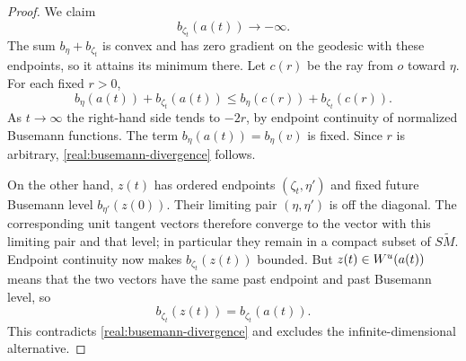 \begin{proof}
We claim
\begin{equation}\label{real:busemann-divergence}
 b_{\zeta_t}(a(t))\longrightarrow-\infty.
\end{equation}
The sum $b_\eta+b_{\zeta_t}$ is convex and has zero gradient on
the geodesic with these endpoints, so it attains its minimum
there. Let $c(r)$ be the ray from $o$ toward $\eta$. For each
fixed $r>0$,
\[
 b_\eta(a(t))+b_{\zeta_t}(a(t))
      \le b_\eta(c(r))+b_{\zeta_t}(c(r)).
\]
As $t\to\infty$ the right-hand side tends to $-2r$, by endpoint
continuity of normalized Busemann functions. The term
$b_\eta(a(t))=b_\eta(v)$ is fixed. Since $r$ is arbitrary,
\eqref{real:busemann-divergence} follows.

On the other hand, $z(t)$ has ordered endpoints
$(\zeta_t,\eta')$ and fixed future Busemann level
$b_{\eta'}(z(0))$. Their limiting pair $(\eta,\eta')$ is off the
diagonal. The corresponding unit tangent vectors therefore
converge to the vector with this limiting pair and that level;
in particular they remain in a compact subset of
$S\widetilde M$. Endpoint continuity now makes
$b_{\zeta_t}(z(t))$ bounded. But $z(t)\in W^u(a(t))$ means that
the two vectors have the same past endpoint and past Busemann
level, so
\[
 b_{\zeta_t}(z(t))=b_{\zeta_t}(a(t)).
\]
This contradicts \eqref{real:busemann-divergence} and excludes
the infinite-dimensional alternative.
\end{proof}
